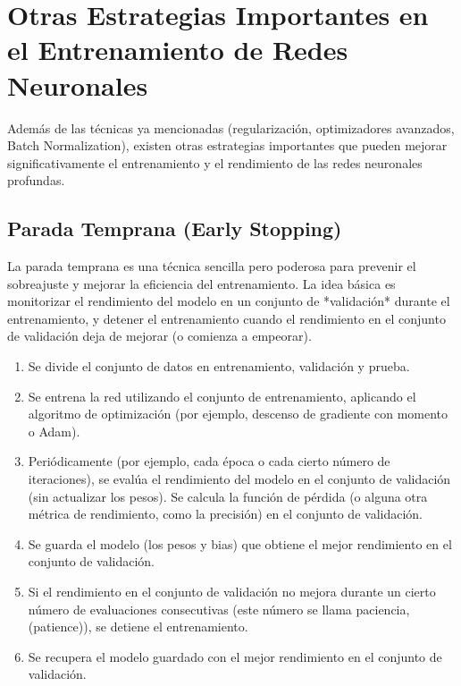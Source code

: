 \documentclass{article}
\begin{document}
\section{Otras Estrategias Importantes en el Entrenamiento de Redes Neuronales}

Además de las técnicas ya mencionadas (regularización, optimizadores avanzados, Batch Normalization), existen otras estrategias importantes que pueden mejorar significativamente el entrenamiento y el rendimiento de las redes neuronales profundas.

\subsection{Parada Temprana (Early Stopping)}

La parada temprana es una técnica sencilla pero poderosa para prevenir el sobreajuste y mejorar la eficiencia del entrenamiento.  La idea básica es monitorizar el rendimiento del modelo en un conjunto de *validación* durante el entrenamiento, y detener el entrenamiento cuando el rendimiento en el conjunto de validación deja de mejorar (o comienza a empeorar).


\begin{enumerate}
    \item Se divide el conjunto de datos en entrenamiento, validación y prueba.
    \item Se entrena la red utilizando el conjunto de entrenamiento, aplicando el algoritmo de optimización (por ejemplo, descenso de gradiente con momento o Adam).
    \item Periódicamente (por ejemplo, cada época o cada cierto número de iteraciones), se evalúa el rendimiento del modelo en el conjunto de validación (sin actualizar los pesos). Se calcula la función de pérdida (o alguna otra métrica de rendimiento, como la precisión) en el conjunto de validación.
    \item Se guarda el modelo (los pesos y bias) que obtiene el mejor rendimiento en el conjunto de validación.
    \item Si el rendimiento en el conjunto de validación no mejora durante un cierto número de evaluaciones consecutivas (este número se llama paciencia, (patience)), se detiene el entrenamiento.
    \item Se recupera el modelo guardado con el mejor rendimiento en el conjunto de validación.
\end{enumerate}
\end{document}
